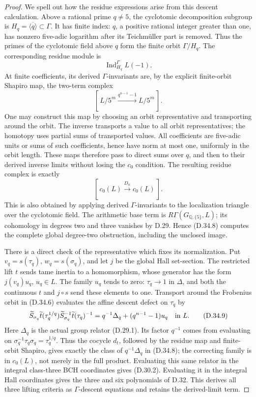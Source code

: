 \begin{proof}
We spell out how the residue expressions arise
from this descent calculation. Above a rational
prime \(q\ne5\), the cyclotomic decomposition
subgroup is \(H_q=\overline{\langle q\rangle}
\subset\Gamma\). It has finite index:
\(q\), a positive rational integer greater
than one, has nonzero five-adic logarithm
after its Teichm\"uller part is removed.
Thus the primes of the cyclotomic field
above \(q\) form the finite orbit
\(\Gamma/H_q\). The corresponding residue
module is
\[
       \operatorname{Ind}_{H_q}^{\Gamma}L(-1).
                                                        \tag{D.34.6}
\]
At finite coefficients, its derived
\(\Gamma\)-invariants are, by the explicit
finite-orbit Shapiro map, the two-term
complex
\[
             [\,L/5^m
                 \xrightarrow{q^{n-1}-1}L/5^m\,].
                                                        \tag{D.34.7}
\]
One may construct this map by choosing an
orbit representative and transporting around
the orbit. The inverse transports a value to
all orbit representatives; the homotopy uses
partial sums of transported values. All
coefficients are five-adic units or sums
of such coefficients, hence have norm at
most one, uniformly in the orbit length.
These maps therefore pass to direct sums
over \(q\), and then to their derived
inverse limits without losing the \(c_0\)
condition. The resulting residue complex
is exactly
\[
                [\,c_0(L)
                     \xrightarrow{D_n}c_0(L)\,].
                                                        \tag{D.34.8}
\]
This is also obtained by applying derived
\(\Gamma\)-invariants to the localization
triangle over the cyclotomic field.
The arithmetic base term is
\(R\Gamma(G_{\mathbb Q,\{5\}},L)\);
its cohomology in degrees two and three
vanishes by D.29. Hence (D.34.8) computes
the complete global degree-two obstruction,
including the unclosed image.

There is a direct check of the representative
which fixes its normalization. Put
\(v_q=s(\tau_q)\), \(w_q=s(\sigma_q)\), and
let \(j\) be the global Hall set-section.
The restricted lift \(t\) sends tame inertia
to a homomorphism, whose generator has the
form \(j(v_q)u_q\), \(u_q\in L\).
The family \(u_q\) tends to zero:
\(\tau_q\to1\) in \(\Delta\), and both
the continuous \(t\) and \(j\circ s\)
send these elements to one.
Transport around the Frobenius orbit in
(D.34.6) evaluates the affine descent defect
on \(\tau_q\) by
\[
 \widetilde S_{\sigma_q}
     \widetilde t(\tau_q^{1/q})
     \widetilde S_{\sigma_q}^{-1}
     \widetilde t(\tau_q)^{-1}
      =q^{-1}\Delta_q+(q^{n-1}-1)u_q
           \quad\hbox{in }L.                  \tag{D.34.9}
\]
Here \(\Delta_q\) is the actual group
relator (D.29.1). Its factor \(q^{-1}\)
comes from evaluating on
\(\sigma_q^{-1}\tau_q\sigma_q=\tau_q^{1/q}\).
Thus the cocycle \(d_t\), followed by the
residue map and finite-orbit Shapiro, gives
exactly the class of \(q^{-1}\Delta_q\)
in (D.34.8); the correcting family is
in \(c_0(L)\), not merely in the full
product. Evaluating this same relator
in the integral class-three BCH coordinates
gives (D.30.2). Evaluating it in the
integral Hall coordinates gives the
three and six polynomials of D.32.
This derives all three lifting criteria
as \(\Gamma\)-descent equations and
retains the derived-limit term.


\end{proof}

